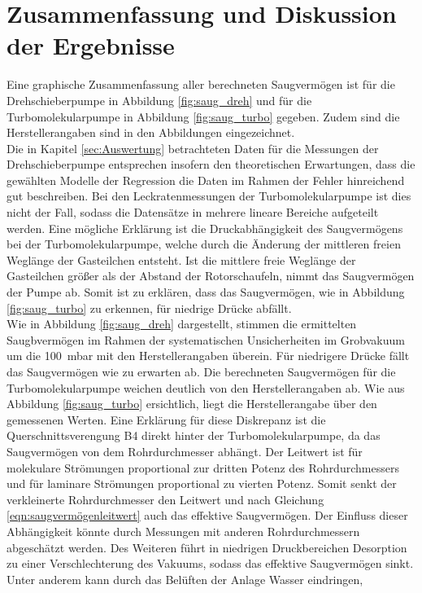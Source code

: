 \section{Zusammenfassung und Diskussion der Ergebnisse}
\label{sec:Diskussion}
Eine graphische Zusammenfassung aller berechneten Saugvermögen ist für die Drehschieberpumpe in 
Abbildung \ref{fig:saug_dreh} und für die Turbomolekularpumpe in Abbildung \ref{fig:saug_turbo} 
gegeben. Zudem sind die Herstellerangaben sind in den Abbildungen eingezeichnet.
\\
Die in Kapitel \ref{sec:Auswertung} betrachteten Daten für die Messungen der Drehschieberpumpe 
entsprechen insofern den theoretischen Erwartungen, dass die gewählten 
Modelle der Regression die Daten im Rahmen der Fehler hinreichend gut beschreiben.
Bei den Leckratenmessungen der Turbomolekularpumpe ist dies nicht der Fall, sodass die Datensätze 
in mehrere lineare Bereiche aufgeteilt werden. Eine mögliche Erklärung ist die Druckabhängigkeit 
des Saugvermögens bei der Turbomolekularpumpe, welche durch die Änderung der mittleren freien
Weglänge der Gasteilchen entsteht. Ist die mittlere freie Weglänge der Gasteilchen
größer als der Abstand der Rotorschaufeln, nimmt das Saugvermögen der Pumpe ab. Somit ist zu 
erklären, dass das Saugvermögen, wie in Abbildung \ref{fig:saug_turbo} zu erkennen, 
für niedrige Drücke abfällt.
\\
Wie in Abbildung \ref{fig:saug_dreh} dargestellt, stimmen die ermittelten Saugbvermögen im Rahmen 
der systematischen Unsicherheiten im Grobvakuum um die \SI{100}{\milli\bar} mit den Herstellerangaben 
überein. Für niedrigere Drücke fällt das Saugvermögen wie zu erwarten ab. 
Die berechneten Saugvermögen für die Turbomolekularpumpe weichen deutlich von den Herstellerangaben
ab. Wie aus Abbildung \ref{fig:saug_turbo} ersichtlich, liegt die Herstellerangabe über den gemessenen Werten.
Eine Erklärung für diese Diskrepanz ist die Querschnittsverengung B4 direkt hinter der Turbomolekularpumpe,
da das Saugvermögen von dem Rohrdurchmesser abhängt.
Der Leitwert ist für molekulare Strömungen proportional zur dritten Potenz des Rohrdurchmessers und für 
laminare Strömungen proportional zu vierten Potenz. 
Somit senkt der verkleinerte Rohrdurchmesser den Leitwert und nach Gleichung \ref{eqn:saugvermögenleitwert} 
auch das effektive Saugvermögen. Der Einfluss dieser Abhängigkeit könnte 
durch Messungen mit anderen Rohrdurchmessern abgeschätzt werden. 
Des Weiteren führt in niedrigen Druckbereichen Desorption zu einer Verschlechterung des Vakuums, sodass
das effektive Saugvermögen sinkt. Unter anderem kann durch das Belüften der Anlage Wasser eindringen, 
